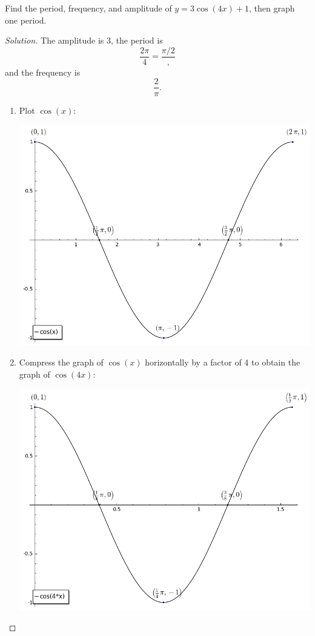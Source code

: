 \documentclass[12pt]{amsart}
\begin{document}
\begin{thm}[20 Points]\label{ex2}
  Find the period, frequency, and amplitude of $y = 3\cos(4x) + 1$, then graph one period.
  
  \begin{proof}[Solution]
    The amplitude is 3, the period is
    $$\frac{2\pi}{4} = \frac{\pi/2},$$
    and the frequency is
    $$\frac{2}{\pi}.$$
    \begin{enumerate}
    \item
      Plot $\cos(x)$:
      \begin{center}
        \includegraphics[scale=0.5]{cos/cos}
      \end{center}
    \item
      Compress the graph of $\cos(x)$ horizontally by a factor of 4 to obtain the graph of $\cos(4x)$:
      \begin{center}
        \includegraphics[scale=0.5]{cos/p_1}

\end{center}
\end{enumerate}
\end{proof}
\end{thm}
\end{document}
